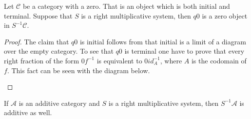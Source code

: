 
    \begin{prop}
        Let $\mathcal{C}$ be a category with a zero. That is an object which is both initial and terminal. Suppose that $S$ is a right multiplicative system, then $q0$ is a zero object in $S^{-1}\mathcal{C}$.
    \end{prop}

    \begin{proof}
        The claim that $q0$ is initial follows from that initial is a limit of a diagram over the empty category. To see that $q0$ is terminal one have to prove that every right fraction of the form $0f^{-1}$ is equivalent to $0id_A^{-1}$, where $A$ is the codomain of $f$. This fact can be seen with the diagram below.
        \begin{center}
        \end{center}
    \end{proof}

    \begin{prop}
        If $\mathcal{A}$ is an additive category and $S$ is a right multiplicative system, then $S^{-1}\mathcal{A}$ is additive as well.
    \end{prop}

